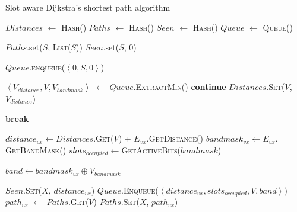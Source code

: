 \documentclass[9pt,twocolumn]{article}
\newcommand*\Let[2]{\State #1 $\gets$ #2}
\begin{document}
\onecolumn
\begin{algorithm}[!h]
	\caption{Slot aware Dijkstra's shortest path algorithm
		\label{alg:sp}
	}
	\begin{algorithmic}[1]
	\Statex
		\Let{$Distances$}{\textsc{Hash()}}
		\Let{$Paths$}{\textsc{Hash()}}
		\Let{$Seen$}{\textsc{Hash()}}
		\Let{$Queue$}{\textsc{Queue()}}

		\State $Paths$.set($S$, \textsc{List($S$)})
		\State $Seen$.set($S$, $0$)

		\State {} \EndIf

		\State $Queue$.\textsc{enqueue($\left<0, S, 0\right>$)}

			\Let{$\left<V_{distance}, V, V_{bandmask}\right>$}{$Queue$.\textsc{ExtractMin()}}
			 \State \textbf{continue} \EndIf
			\State $Distances$.\textsc{Set($V$, $V_{distance}$)}

			 \State \textbf{break} \EndIf
			
				\State $distance_{vx} \gets Distances$.\textsc{Get}($V$) + $E_{vx}$.\textsc{GetDistance()}
				\State $bandmask_{vx} \gets E_{vx}.$\textsc{GetBandMask()}
				\State $slots_{occupied} \gets $\textsc{GetActiveBits($bandmask$)}

				\State $band \gets bandmask_{vx} \oplus V_{bandmask}$

					\State $Seen.$\textsc{Set($X$, $distance_{vx}$)}
					\State $Queue.$\textsc{Enqueue($\left< distance_{vx}, slots_{occupied}, V, band \right>$)}
					\Let{$path_{vx}$}{$Paths.$\textsc{Get($V$)}}
					\State{$path_{vx}.$\textsc{Append(X)}}
					\State $Paths.$\textsc{Set($X$, $path_{vx}$)}
				\EndIf
			\EndFor
		\EndWhile

		\State {}

	\EndFunction
	\end{algorithmic}
\end{algorithm}
\end{document}
